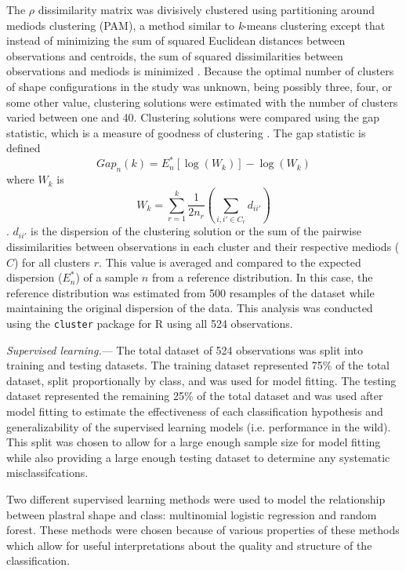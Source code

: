 \documentclass[12pt,letterpaper]{article}\usepackage{graphicx, color}
\renewcommand{\subsubsection}[1]{%
\vspace{2ex}
\noindent
\textit{#1.}---}
\begin{document}
The \(\rho\) dissimilarity matrix was divisively clustered using partitioning around mediods clustering (PAM), a method similar to \textit{k}-means clustering except that instead of minimizing the sum of squared Euclidean distances between observations and centroids, the sum of squared dissimilarities between observations and mediods is minimized \citep{Kaufman1990}.
Because the optimal number of clusters of shape configurations in the study was unknown, being possibly three, four, or some other value, clustering solutions were estimated with the number of clusters varied between one and 40. Clustering solutions were compared using the gap statistic, which is a measure of goodness of clustering \citep{Tibshirani2001a}. The gap statistic is defined
\[Gap_{n}(k) = E^{*}_{n}[\log(W_{k})] - \log(W_{k})\] 
where \(W_{k}\) is
\[W_{k} = \sum^{k}_{r = 1}{\frac{1}{2n_{r}} (\sum_{i,i' \in C_{r}} d_{ii'})}\].
\(d_{ii'}\) is the dispersion of the clustering solution or the sum of the pairwise dissimilarities between observations in each cluster and their respective mediods (\(C\)) for all clusters \(r\). This value is averaged and compared to the expected dispersion (\(E^{*}_{n}\)) of a sample \(n\) from a reference distribution. In this case, the reference distribution was estimated from 500 resamples of the dataset while maintaining the original dispersion of the data.
This analysis was conducted using the \texttt{cluster} package for R \citep{Maechler2013} using all 524 observations.

\subsubsection{Supervised learning}
The total dataset of 524 observations was split into training and testing datasets. The training dataset represented 75\% of the total dataset, split proportionally by class, and was used for model fitting. The testing dataset represented the remaining 25\% of the total dataset and  was used after model fitting to estimate the effectiveness of each classification hypothesis and generalizability of the supervised learning models (i.e. performance in the wild). This split was chosen to allow for a large enough sample size for model fitting while also providing a large enough testing dataset to determine any systematic misclassifcations.

Two different supervised learning methods were used to model the relationship between plastral shape and class: multinomial logistic regression and random forest. These methods were chosen because of various properties of these methods which allow for useful interpretations about the quality and structure of the classification.
\end{document}
